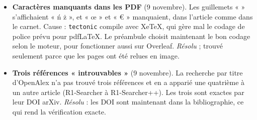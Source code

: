 \documentclass[10pt,a4paper]{article}
\newcommand{\f}[1]{\texttt{\small #1}}
\begin{document}
\begin{itemize}
\item \textbf{Caractères manquants dans les PDF} (9 novembre). Les guillemets « » s'affichaient « ń ż », et « œ » et « € » manquaient, dans l'article comme dans le carnet. Cause : \f{tectonic} compile avec XeTeX, qui gère mal le codage de police prévu pour pdfLaTeX. Le préambule choisit maintenant le bon codage selon le moteur, pour fonctionner aussi sur Overleaf. \emph{Résolu} ; trouvé seulement parce que les pages ont été relues en image.
\item \textbf{Trois références « introuvables »} (9 novembre). La recherche par titre d'OpenAlex n'a pas trouvé trois références et en a apparié une quatrième à un autre article (R1-Searcher à R1-Searcher++). Les trois sont exactes par leur DOI arXiv. \emph{Résolu} : les DOI sont maintenant dans la bibliographie, ce qui rend la vérification exacte.
\end{itemize}
\end{document}
